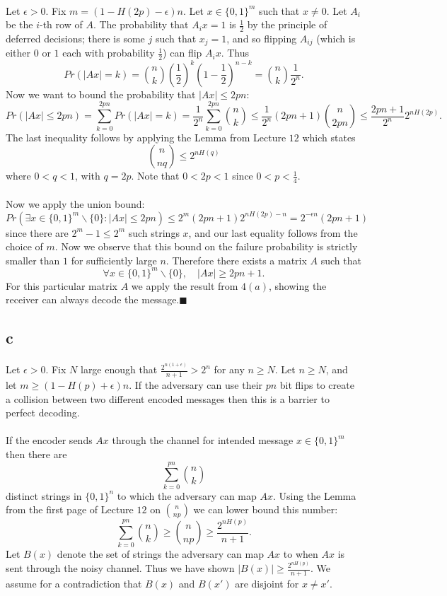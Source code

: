 \documentclass[letterpaper,12pt,oneside,onecolumn]{article}
\begin{document}
\paragraph{}
Let $\epsilon > 0$. Fix $m=(1-H(2p) - \epsilon)n$. Let $x \in \{0,1\}^m$ such that $x\neq 0$. Let $A_i$ be the $i$-th row of $A$. The probability that $A_ix=1$ is $\frac{1}{2}$ by the principle of deferred decisions; there is some $j$ such that $x_j = 1$, and so flipping $A_{ij}$ (which is either $0$ or $1$ each with probability $\frac{1}{2}$) can flip $A_ix$. Thus
$$Pr(|Ax| =k) = {n\choose k}(\frac{1}{2})^k(1-\frac{1}{2})^{n-k} = {n\choose k}\frac{1}{2^n}.$$
Now we want to bound the probability that $|Ax| \leq 2pn$:
$$Pr(|Ax| \leq 2pn) = \sum_{k=0}^{2pn}Pr(|Ax| = k) = \frac{1}{2^n}\sum_{k=0}^{2pn}{n\choose k} \leq \frac{1}{2^n}(2pn+1){n\choose 2pn} \leq \frac{2pn+1}{2^n}2^{nH(2p)}.$$
The last inequality follows by applying the Lemma from Lecture $12$ which states
$${n\choose nq} \leq 2^{nH(q)}$$
where $0<q<1$, with $q=2p$. Note that $0<2p<1$ since $0<p<\frac{1}{4}$.
\paragraph{}
Now we apply the union bound:
$$Pr(\exists x\in\{0,1\}^m\backslash\{0\}: |Ax|\leq 2pn) \leq 2^{m}(2pn+1)2^{nH(2p)-n} = 2^{-\epsilon n }(2pn+1)$$
since there are $2^{m}-1\leq 2^m$ such strings $x$, and our last equality follows from the choice of $m$. Now we observe that this bound on the failure probability is strictly smaller than $1$ for sufficiently large $n$. Therefore there exists a matrix $A$ such that 
$$\forall x \in \{0,1\}^m\backslash\{0\}, \quad |Ax| \geq 2pn+1.$$
For this particular matrix $A$ we apply the result from $4(a)$, showing the receiver can always decode the message.$\blacksquare$
\subsection{c}
\paragraph{}
Let $\epsilon > 0$. Fix $N$ large enough that $\frac{2^{n(1+\epsilon)}}{n+1} > 2^n$ for any $n \geq N$. Let $n \geq N$, and let $m \geq (1 - H(p) + \epsilon)n$. If the adversary can use their $pn$ bit flips to create a collision between two different encoded messages then this is a barrier to perfect decoding.
\paragraph{}
If the encoder sends $Ax$ through the channel for intended message $x \in \{0,1\}^m$ then there are
$$\sum_{k=0}^{pn}{n\choose k} $$
distinct strings in $\{0,1\}^n$ to which the adversary can map $Ax$. Using the Lemma from the first page of Lecture $12$ on ${n\choose np}$ we can lower bound this number:
$$\sum_{k=0}^{pn}{n\choose k} \geq {n\choose np} \geq \frac{2^{nH(p)}}{n+1}.$$
Let $B(x)$ denote the set of strings the adversary can map $Ax$ to when $Ax$ is sent through the noisy channel. Thus we have shown $|B(x)| \geq \frac{2^{nH(p)}}{n+1}$. We assume for a contradiction that $B(x)$ and $B(x')$ are disjoint for $x\neq x'$.
\end{document}
